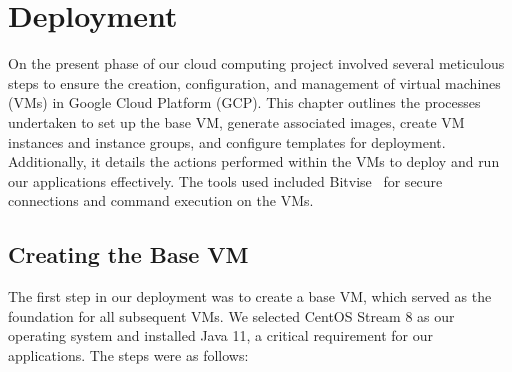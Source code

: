 \chapter{Deployment}\label{ch:deployment}

On the present phase of our cloud computing project involved several meticulous steps to ensure the creation,
configuration, and management of virtual machines (VMs) in Google Cloud Platform (GCP). This chapter outlines
the processes undertaken to set up the base VM, generate associated images, create VM instances and instance groups,
and configure templates for deployment.
Additionally, it details the actions performed within the VMs to deploy and run our applications effectively.
The tools used included Bitvise~\cite{bitvise-ssh-client} for secure connections and command execution on the VMs.


\section{Creating the Base VM}\label{sec:creating-the-base-vm}

The first step in our deployment was to create a base VM, which served as the foundation for all subsequent VMs.
We selected CentOS Stream 8 as our operating system and installed Java 11, a critical requirement for our applications.
The steps were as follows:

